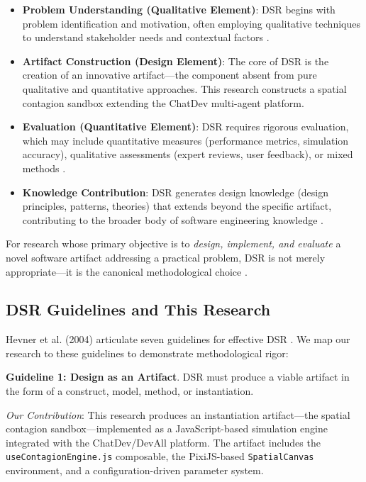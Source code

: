 \begin{itemize}
    \item \textbf{Problem Understanding (Qualitative Element)}: DSR begins with problem identification and motivation, often employing qualitative techniques to understand stakeholder needs and contextual factors \cite{peffers2007design}.
    
    \item \textbf{Artifact Construction (Design Element)}: The core of DSR is the creation of an innovative artifact---the component absent from pure qualitative and quantitative approaches. This research constructs a spatial contagion sandbox extending the ChatDev multi-agent platform.
    
    \item \textbf{Evaluation (Quantitative Element)}: DSR requires rigorous evaluation, which may include quantitative measures (performance metrics, simulation accuracy), qualitative assessments (expert reviews, user feedback), or mixed methods \cite{hevner2004design}.
    
    \item \textbf{Knowledge Contribution}: DSR generates design knowledge (design principles, patterns, theories) that extends beyond the specific artifact, contributing to the broader body of software engineering knowledge \cite{gregor2007nature}.
\end{itemize}

For research whose primary objective is to \textit{design, implement, and evaluate} a novel software artifact addressing a practical problem, DSR is not merely appropriate---it is the canonical methodological choice \cite{wieringa2014design}.

\subsection{DSR Guidelines and This Research}

Hevner et al. (2004) articulate seven guidelines for effective DSR \cite{hevner2004design}. We map our research to these guidelines to demonstrate methodological rigor:

\textbf{Guideline 1: Design as an Artifact}. DSR must produce a viable artifact in the form of a construct, model, method, or instantiation.

\emph{Our Contribution}: This research produces an instantiation artifact---the spatial contagion sandbox---implemented as a JavaScript-based simulation engine integrated with the ChatDev/DevAll platform. The artifact includes the \texttt{useContagionEngine.js} composable, the PixiJS-based \texttt{SpatialCanvas} environment, and a configuration-driven parameter system.


